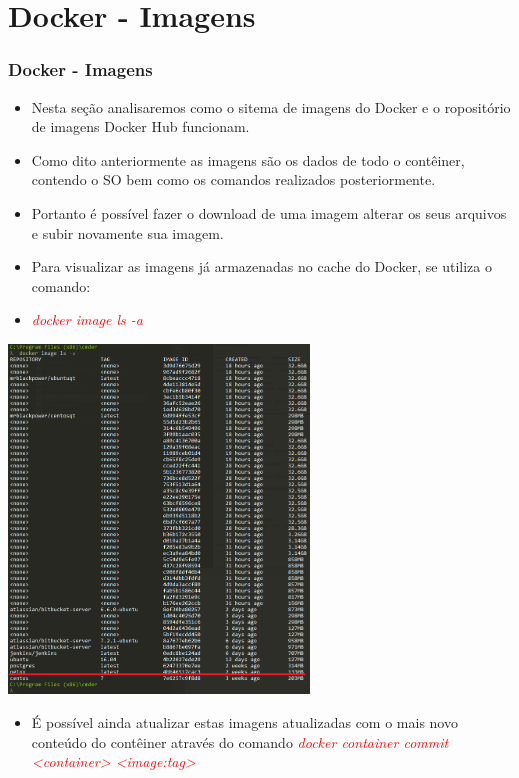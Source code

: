 \documentclass[10pt]{beamer}
\theoremstyle{remark}
\theoremstyle{definition}
\newcommand{\code}[1]{\textcolor{red} {\textit{#1}}} %
\begin{document}
\section{Docker - Imagens}
\begin{frame}[allowframebreaks]
\frametitle{Docker - Imagens}
	
	\begin{itemize}
		\item Nesta seção analisaremos como o sitema de imagens do Docker e o ropositório de imagens Docker Hub funcionam.
		
		\item Como dito anteriormente as imagens são os dados de todo o contêiner, contendo o SO bem como os comandos realizados posteriormente.
		
		\item Portanto é possível fazer o download de uma imagem alterar os seus arquivos e subir novamente sua imagem.
		
		\item Para visualizar as imagens já armazenadas no cache do Docker, se utiliza o comando:
		
		\item \code{docker image ls -a}
	\end{itemize}
		
	\framebreak	
		
	\begin{center}
		\includegraphics[width=0.6\textwidth]{images/14.png}
	\end{center}
			
	\framebreak	
	
	\begin{itemize}
		\item É possível ainda atualizar estas imagens atualizadas com o mais novo conteúdo do contêiner através do comando \code{docker container commit <container> <image:tag>}
	\end{itemize}
	

\end{frame}
\end{document}
